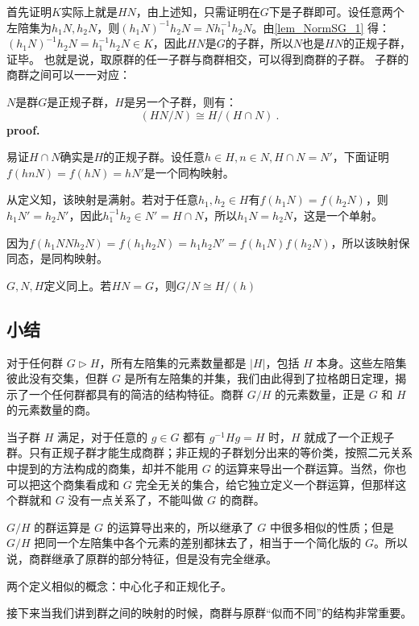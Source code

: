 首先证明$K$实际上就是$HN$，由上述知，只需证明在$G$下是子群即可。设任意两个左陪集为$h_1N,h_2N$，则$(h_1N)^{-1}h_2N=Nh_1^{-1}h_2N$。由\autoref{lem_NormSG_1} 得：$(h_1N)^{-1}h_2N=h_1^{-1}h_2N\in K$，因此$HN$是$G$的子群，所以$N$也是$HN$的正规子群，证毕。
也就是说，取原群的任一子群与商群相交，可以得到商群的子群。
子群的商群之间可以一一对应：
\begin{theorem}{}
$N$是群$G$是正规子群，$H$是另一个子群，则有：
\begin{equation}
(HN/N)\cong H/(H\cap N)~.
\end{equation}
\textbf{proof.}

易证$H\cap N$确实是$H$的正规子群。设任意$h\in H,n\in N,H\cap N=N'$，下面证明$f(hnN)=f(hN)=hN'$是一个同构映射。

从定义知，该映射是满射。若对于任意$h_1,h_2\in H$有$f(h_1N)=f(h_2N)$，则$h_1N'=h_2N'$，因此$h_1^{-1}h_2\in N'=H\cap N$，所以$h_1N=h_2N$，这是一个单射。

因为$f(h_1NNh_2N)=f(h_1h_2N)=h_1h_2N'=f(h_1N)f(h_2N)$，所以该映射保同态，是同构映射。

\begin{corollary}{}
$G,N,H$定义同上。若$HN=G$，则$G/N\cong H/(h)$
\end{corollary}
\end{theorem}
\subsection{小结}
对于任何群 $G\vartriangleright H$，所有左陪集的元素数量都是 $|H|$，包括 $H$ 本身。这些左陪集彼此没有交集，但群 $G$ 是所有左陪集的并集，我们由此得到了拉格朗日定理，揭示了一个任何群都具有的简洁的结构特征。商群 $G/H$ 的元素数量，正是 $G$ 和 $H$ 的元素数量的商。

当子群 $H$ 满足，对于任意的 $g\in G$ 都有 $g^{-1}Hg=H$ 时，$H$ 就成了一个正规子群。只有正规子群才能生成商群；非正规的子群划分出来的等价类，按照二元关系中提到的方法构成的商集，却并不能用 $G$ 的运算来导出一个群运算。当然，你也可以把这个商集看成和 $G$ 完全无关的集合，给它独立定义一个群运算，但那样这个群就和 $G$ 没有一点关系了，不能叫做 $G$ 的商群。

$G/H$ 的群运算是 $G$ 的运算导出来的，所以继承了 $G$ 中很多相似的性质；但是 $G/H$ 把同一个左陪集中各个元素的差别都抹去了，相当于一个简化版的 $G$。所以说，商群继承了原群的部分特征，但是没有完全继承。

两个定义相似的概念：中心化子和正规化子。

接下来当我们讲到群之间的映射的时候，商群与原群“似而不同”的结构非常重要。

